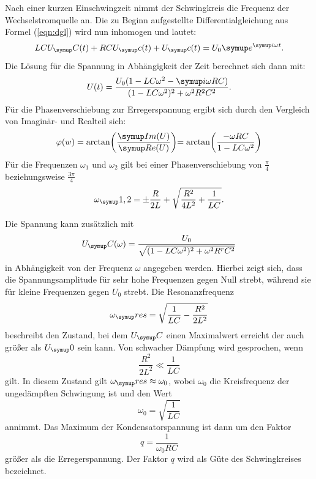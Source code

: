 Nach einer kurzen Einschwingzeit nimmt der Schwingkreis die Frequenz der
Wechselstromquelle an. Die zu Beginn aufgestellte Differentialgleichung aus
Formel (\ref{eqn:dgl}) wird nun inhomogen und lautet:
\begin{equation}
  LCU_\su{C}(t) + RCU_\su{c}(t) + U_\su{c}(t) =U_0\su{e}^{\su{i}\omega t}.
  \label{eqn:inh}
\end{equation}
Die Lösung für die Spannung in Abhängigkeit der Zeit berechnet sich dann mit:
\begin{equation}
  U(t)=\frac{U_0(1-LC\omega^2-\su{i}\omega RC)}{(1-LC\omega^2)^2+\omega^2 R^2 C^2}.
\end{equation}
Für die Phasenverschiebung zur Erregerspannung ergibt sich durch den Vergleich
von Imaginär- und Realteil sich: %
\begin{equation}
  \varphi(w)=\arctan\biggr(\frac{\su{Im}(U)}{\su{Re}(U)}\biggl)
  =\arctan\biggr(\frac{-\omega RC}{1-LC\omega^2}\biggl)
\end{equation}
Für die Frequenzen $\omega_1$ und $\omega_2$ gilt bei einer Phasenverschiebung
von $\frac{\pi}{4}$ beziehungsweise $\frac{3\pi}{4}$
\begin{equation}
  \omega_\su{1,2}=\pm\frac{R}{2L}+\sqrt{\frac{R^2}{4L^2}+\frac{1}{LC}}.
\end{equation}

Die Spannung kann zusätzlich mit
\begin{equation}
  U_\su{C}(\omega)=\frac{U_0}{\sqrt{(1-LC\omega^2)^2+\omega^2R^rC^2}}
\end{equation}
in Abhängigkeit von der Frequenz $\omega$ angegeben werden.
Hierbei zeigt sich, dass die Spannungsamplitude für sehr hohe Frequenzen gegen
Null strebt, während sie für kleine Frequenzen gegen $U_0$ strebt.
Die Resonanzfrequenz
\begin{equation}
  \omega_\su{res}=\sqrt{\frac{1}{LC}-\frac{R^2}{2L^2}}
\end{equation}
beschreibt den Zustand, bei dem $U_\su{C}$ einen Maximalwert erreicht der auch
größer als $U_\su{0}$ sein kann.
Von schwacher Dämpfung wird gesprochen, wenn
\begin{equation}
  \frac{R^2}{2L^2} \ll \frac{1}{LC}
\end{equation}
gilt. In diesem Zustand gilt $\omega_\su{res}\approx\omega_0$, wobei $\omega_0$
die Kreisfrequenz der ungedämpften Schwingung ist und den Wert
\begin{equation}
  \omega_0 =\sqrt{\frac{1}{LC}}
\end{equation}
annimmt. Das Maximum der Kondensatorspannung ist dann um den Faktor
\begin{equation}
  q=\frac{1}{\omega_0RC}
\end{equation}
größer als die Erregerspannung. Der Faktor $q$ wird als Güte des Schwingkreises
bezeichnet.

